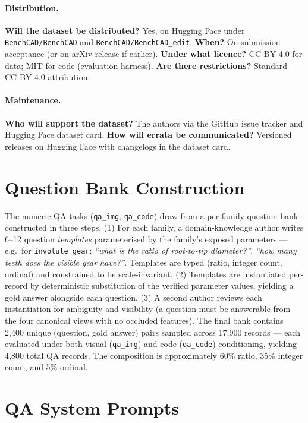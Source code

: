 \paragraph{Distribution.}
\textbf{Will the dataset be distributed?} Yes, on Hugging Face under \texttt{BenchCAD/BenchCAD} and \texttt{BenchCAD/BenchCAD\_edit}.
\textbf{When?} On submission acceptance (or on arXiv release if earlier).
\textbf{Under what licence?} CC-BY-4.0 for data; MIT for code (evaluation harness).
\textbf{Are there restrictions?} Standard CC-BY-4.0 attribution.

\paragraph{Maintenance.}
\textbf{Who will support the dataset?} The authors via the GitHub issue tracker and Hugging Face dataset card.
\textbf{How will errata be communicated?} Versioned releases on Hugging Face with changelogs in the dataset card.

\section{Question Bank Construction}
\label{app:qbank}

The numeric-QA tasks (\texttt{qa\_img}, \texttt{qa\_code}) draw from a per-family question bank constructed in three steps. (1) For each family, a domain-knowledge author writes 6--12 question \emph{templates} parameterised by the family's exposed parameters --- e.g.\ for \texttt{involute\_gear}: \emph{``what is the ratio of root-to-tip diameter?''}, \emph{``how many teeth does the visible gear have?''}.
Templates are typed (ratio, integer count, ordinal) and constrained to be scale-invariant. (2) Templates are instantiated per-record by deterministic substitution of the verified parameter values, yielding a gold answer alongside each question. (3) A second author reviews each instantiation for ambiguity and visibility (a question must be answerable from the four canonical views with no occluded features).
The final bank contains 2{,}400 unique (question, gold answer) pairs sampled across 17{,}900 records --- each evaluated under both visual (\texttt{qa\_img}) and code (\texttt{qa\_code}) conditioning, yielding 4{,}800 total QA records.
The composition is approximately 60\% ratio, 35\% integer count, and 5\% ordinal.

\section{QA System Prompts}
\label{app:qa-system-prompts}

